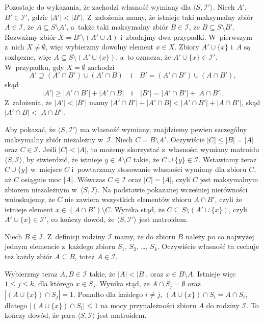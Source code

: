 Pozostaje do wykazania, że zachodzi własność wymiany dla $\langle S,\mathcal{I}'\rangle$.
Niech $A'$, $B'\in\mathcal{I}'$, gdzie $|A'|<|B'|$.
Z~założenia mamy, że istnieje taki maksymalny zbiór $A\in\mathcal{I}$, że $A\subseteq S\setminus A'$, a~także taki maksymalny zbiór $B\in\mathcal{I}$, że $B\subseteq S\setminus B'$.
Rozważmy zbiór $X=B'\setminus(A'\cup A)$ i~zbadajmy dwa przypadki.
W~pierwszym z~nich $X\ne\emptyset$, więc wybierzmy dowolny element $x\in X$.
Zbiory $A'\cup\{x\}$ i~$A$ są rozłączne, więc $A\subseteq S\setminus(A'\cup\{x\})$, a~to oznacza, że $A'\cup\{x\}\in\mathcal{I}'$.
W~przypadku, gdy $X=\emptyset$ zachodzi
\[
	A' \supseteq (A'\cap B')\cup(A'\cap B) \quad\text{i}\quad B' = (A'\cap B')\cup(A\cap B'),
\]
skąd
\[
	|A'| \ge |A'\cap B'|+|A'\cap B| \quad\text{i}\quad |B'| = |A'\cap B'|+|A\cap B'|.
\]
Z~założenia, że $|A'|<|B'|$ mamy $|A'\cap B'|+|A'\cap B|<|A'\cap B'|+|A\cap B'|$, skąd $|A'\cap B|<|A\cap B'|$.

Aby pokazać, że $\langle S,\mathcal{I}'\rangle$ ma własność wymiany, znajdziemy pewien szczególny maksymalny zbiór niezależny w~$\mathcal{I}$.
Niech $C=B\setminus A'$.
Oczywiście $|C|\le|B|=|A|$ oraz $C\in\mathcal{I}$.
Jeśli $|C|<|A|$, to możemy skorzystać z~własności wymiany matroidu $\langle S,\mathcal{I}\rangle$, by stwierdzić, że istnieje $y\in A\setminus C$ takie, że $C\cup\{y\}\in\mathcal{I}$.
Wstawiamy teraz $C\cup\{y\}$ w~miejsce $C$ i~powtarzamy stosowanie własności wymiany dla zbioru $C$, aż $C$ osiągnie moc $|A|$.
Wówczas $C\in\mathcal{I}$ oraz $|C|=|A|$, czyli $C$ jest maksymalnym zbiorem niezależnym w~$\langle S,\mathcal{I}\rangle$.
Na podstawie pokazanej wcześniej nierówności wnioskujemy, że $C$ nie zawiera wszystkich elementów zbioru $A\cap B'$, czyli że istnieje element $x\in(A\cap B')\setminus C$.
Wynika stąd, że $C\subseteq S\setminus(A'\cup\{x\})$, czyli $A'\cup\{x\}\in\mathcal{I}'$, co kończy dowód, że $\langle S,\mathcal{I}'\rangle$ jest matroidem.

\exercise %
Niech $B\in\mathcal{I}$.
Z~definicji rodziny $\mathcal{I}$ mamy, że do zbioru $B$ należy po co najwyżej jednym elemencie z~każdego zbioru $S_1$, $S_2$, \dots, $S_k$.
Oczywiście własność ta cechuje też każdy zbiór $A\subseteq B$, toteż $A\in\mathcal{I}$.

Wybierzmy teraz $A,B\in\mathcal{I}$ takie, że $|A|<|B|$, oraz $x\in B\setminus A$.
Istnieje więc $1\le j\le k$, dla którego $x\in S_j$.
Wynika stąd, że $A\cap S_j=\emptyset$ oraz $|(A\cup\{x\})\cap S_j|=1$.
Ponadto dla każdego $i\ne j$, $(A\cup\{x\})\cap S_i=A\cap S_i$, dlatego $|(A\cup\{x\})\cap S_i|\le1$ na mocy przynależności zbioru $A$ do rodziny $\mathcal{I}$.
To kończy dowód, że para $\langle S,\mathcal{I}\rangle$ jest matroidem.

